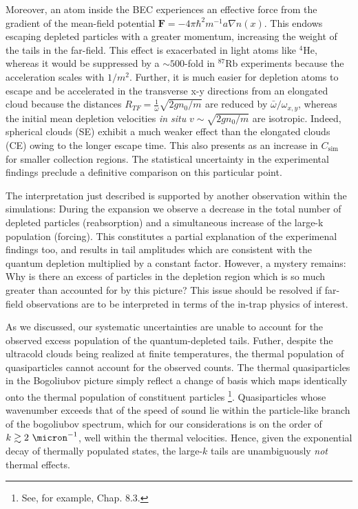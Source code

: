 	Moreover, an atom inside the BEC experiences an effective force from the gradient of the mean-field potential $\textbf{F} = -4\pi\hbar^2 m^{-1}a \nabla  n(x)$. 
	This endows escaping depleted particles with a greater momentum, increasing the weight of the tails in the far-field. 
	This effect is exacerbated in light atoms like $^{4}$He, whereas it would be suppressed by a $\sim500$-fold in $^{87}$Rb experiments \cite{Makotyn14} because the acceleration scales with $1/m^2$. 
	Further, it is much easier for depletion atoms to escape and be accelerated in the transverse x-y directions from an elongated cloud because the distances $R_{TF}=\frac{1}{\omega}\sqrt{2gn_0/m}$ are reduced by $\bar{\omega}/\omega_{x,y}$, whereas the initial mean depletion velocities \textit{in situ} $v\sim \sqrt{2gn_0/m}$ are isotropic.
	Indeed, spherical clouds (SE) exhibit a much weaker effect than the elongated clouds (CE) owing to the longer escape time.
	This also presents as an increase in $C_\textrm{sim}$ for smaller collection regions. 
	The statistical uncertainty in the experimental findings preclude a definitive comparison on this particular point.

	The interpretation just described is supported by another observation within the simulations:
	During the expansion we observe a decrease in the total number of depleted particles (reabsorption) and a simultaneous increase of the large-k population (forcing). 
	This constitutes a partial explanation of the experimenal findings too, and results in tail amplitudes which are consistent with the quantum depletion multiplied by a constant factor. 
	However, a mystery remains: Why is there an excess of particles in the depletion region which is so much greater than accounted for by this picture? 
	This issue should be resolved if far-field observations are to be interpreted in terms of the in-trap physics of interest. 
	
	As we discussed, our systematic uncertainties are unable to account for the observed excess population of the quantum-depleted tails.
	Futher, despite the ultracold clouds being realized at finite temperatures, the thermal population of quasiparticles cannot account for the observed counts. 
	The thermal quasiparticles in the Bogoliubov picture simply reflect a change of basis which maps identically onto the thermal population of constituent particles \footnote{See, for example, \cite{PethickSmith} Chap. 8.3.}. 
	Quasiparticles whose wavenumber exceeds that of the speed of sound lie within the particle-like branch of the bogoliubov spectrum, which for our considerations is on the order of $k\gtrsim2~\micron^{-1}$, well within the thermal velocities. 
	Hence, given the exponential decay of thermally populated states, the large-$k$ tails are unambiguously \emph{not} thermal effects. 

